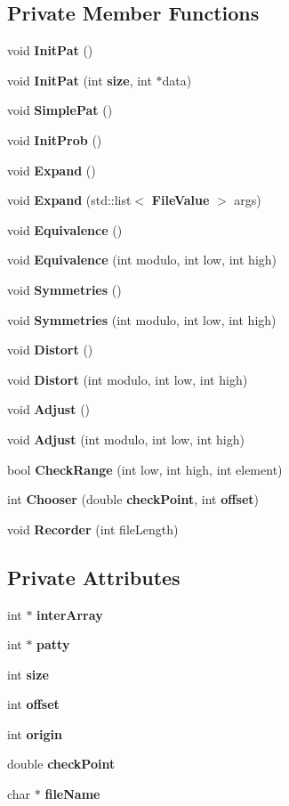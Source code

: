 \subsection*{Private Member Functions}
\begin{CompactItemize}
\item 
void {\bf Init\-Pat} ()
\item 
void {\bf Init\-Pat} (int {\bf size}, int $\ast$data)
\item 
void {\bf Simple\-Pat} ()
\item 
void {\bf Init\-Prob} ()
\item 
void {\bf Expand} ()
\item 
void {\bf Expand} (std::list$<$ {\bf File\-Value} $>$ args)
\item 
void {\bf Equivalence} ()
\item 
void {\bf Equivalence} (int modulo, int low, int high)
\item 
void {\bf Symmetries} ()
\item 
void {\bf Symmetries} (int modulo, int low, int high)
\item 
void {\bf Distort} ()
\item 
void {\bf Distort} (int modulo, int low, int high)
\item 
void {\bf Adjust} ()
\item 
void {\bf Adjust} (int modulo, int low, int high)
\item 
bool {\bf Check\-Range} (int low, int high, int element)
\item 
int {\bf Chooser} (double {\bf check\-Point}, int {\bf offset})
\item 
void {\bf Recorder} (int file\-Length)
\end{CompactItemize}
\subsection*{Private Attributes}
\begin{CompactItemize}
\item 
int $\ast$ {\bf inter\-Array}
\item 
int $\ast$ {\bf patty}
\item 
int {\bf size}
\item 
int {\bf offset}
\item 
int {\bf origin}
\item 
double {\bf check\-Point}
\item 
char $\ast$ {\bf file\-Name}
\end{CompactItemize}


